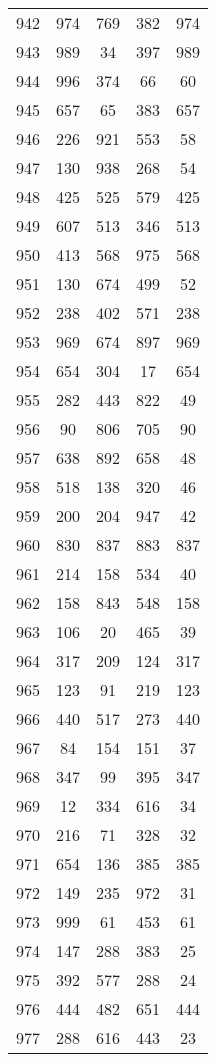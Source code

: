 \documentclass[a4paper,10pt,ngerman]{scrartcl}
\begin{document}
\begin{longtable}[c]{c|c|c|c|c}
    942 & 974 & 769 & 382 & 974 \\
    943 & 989 & 34 & 397 & 989 \\
    944 & 996 & 374 & 66 & 60 \\
    945 & 657 & 65 & 383 & 657 \\
    946 & 226 & 921 & 553 & 58 \\
    947 & 130 & 938 & 268 & 54 \\
    948 & 425 & 525 & 579 & 425 \\
    949 & 607 & 513 & 346 & 513 \\
    950 & 413 & 568 & 975 & 568 \\
    951 & 130 & 674 & 499 & 52 \\
    952 & 238 & 402 & 571 & 238 \\
    953 & 969 & 674 & 897 & 969 \\
    954 & 654 & 304 & 17 & 654 \\
    955 & 282 & 443 & 822 & 49 \\
    956 & 90 & 806 & 705 & 90 \\
    957 & 638 & 892 & 658 & 48 \\
    958 & 518 & 138 & 320 & 46 \\
    959 & 200 & 204 & 947 & 42 \\
    960 & 830 & 837 & 883 & 837 \\
    961 & 214 & 158 & 534 & 40 \\
    962 & 158 & 843 & 548 & 158 \\
    963 & 106 & 20 & 465 & 39 \\
    964 & 317 & 209 & 124 & 317 \\
    965 & 123 & 91 & 219 & 123 \\
    966 & 440 & 517 & 273 & 440 \\
    967 & 84 & 154 & 151 & 37 \\
    968 & 347 & 99 & 395 & 347 \\
    969 & 12 & 334 & 616 & 34 \\
    970 & 216 & 71 & 328 & 32 \\
    971 & 654 & 136 & 385 & 385 \\
    972 & 149 & 235 & 972 & 31 \\
    973 & 999 & 61 & 453 & 61 \\
    974 & 147 & 288 & 383 & 25 \\
    975 & 392 & 577 & 288 & 24 \\
    976 & 444 & 482 & 651 & 444 \\
    977 & 288 & 616 & 443 & 23 \\

\end{longtable}
\end{document}
